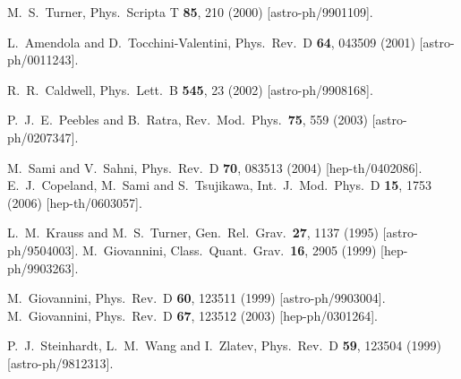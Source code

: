 \documentclass[prd,twocolumn,superscriptaddress]{revtex4}
\begin{document}
\begin{thebibliography}{99}
  M.~S.~Turner,
  Phys.\ Scripta T {\bf 85}, 210 (2000)
  [astro-ph/9901109].
  
  L.~Amendola and D.~Tocchini-Valentini,
  Phys.\ Rev.\ D {\bf 64}, 043509 (2001)
  [astro-ph/0011243].
  
  R.~R.~Caldwell,
  Phys.\ Lett.\ B {\bf 545}, 23 (2002)
  [astro-ph/9908168].
  
  P.~J.~E.~Peebles and B.~Ratra,
  Rev.\ Mod.\ Phys.\  {\bf 75}, 559 (2003)
  [astro-ph/0207347].
  
  M.~Sami and V.~Sahni,
  Phys.\ Rev.\ D {\bf 70}, 083513 (2004)
  [hep-th/0402086].
  E.~J.~Copeland, M.~Sami and S.~Tsujikawa,
  Int.\ J.\ Mod.\ Phys.\ D {\bf 15}, 1753 (2006)
  [hep-th/0603057].
  
  L.~M.~Krauss and M.~S.~Turner,
  Gen.\ Rel.\ Grav.\  {\bf 27}, 1137 (1995)
  [astro-ph/9504003].
  M.~Giovannini,
  Class.\ Quant.\ Grav.\  {\bf 16}, 2905 (1999)
  [hep-ph/9903263].
  
  M.~Giovannini,
  Phys.\ Rev.\ D {\bf 60}, 123511 (1999)
  [astro-ph/9903004].
  M.~Giovannini,
  Phys.\ Rev.\ D {\bf 67}, 123512 (2003)
  [hep-ph/0301264].
  
  P.~J.~Steinhardt, L.~M.~Wang and I.~Zlatev,
  Phys.\ Rev.\ D {\bf 59}, 123504 (1999)
  [astro-ph/9812313].
  

\end{thebibliography}
\end{document}
